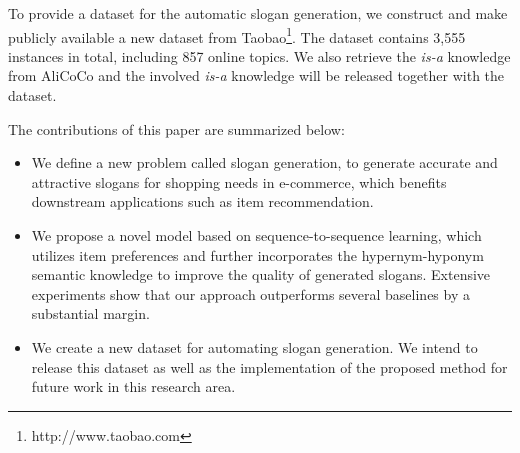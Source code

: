 To provide a dataset for the automatic slogan generation,
we construct and make publicly available a new dataset from Taobao\footnote{http://www.taobao.com}.
The dataset contains 3,555 instances in total, including 857 online topics.
We also retrieve the \emph{is-a} knowledge
from AliCoCo and the involved \emph{is-a} knowledge will be released together with the dataset.

The contributions of this paper are summarized below:
\begin{itemize}
	\item We define a new problem called slogan generation, to generate accurate and attractive slogans for shopping needs in e-commerce, which benefits downstream applications such as item recommendation.
	\item We propose a novel model based on sequence-to-sequence learning, 
	which utilizes item preferences and further incorporates the hypernym-hyponym semantic knowledge to improve the quality of generated slogans. Extensive experiments show that our approach outperforms several baselines by a substantial margin.
	\item We create a new dataset for automating slogan generation.
	We intend to release this dataset as well as the implementation of the proposed method for future work in this research area. 
\end{itemize}





%





%

